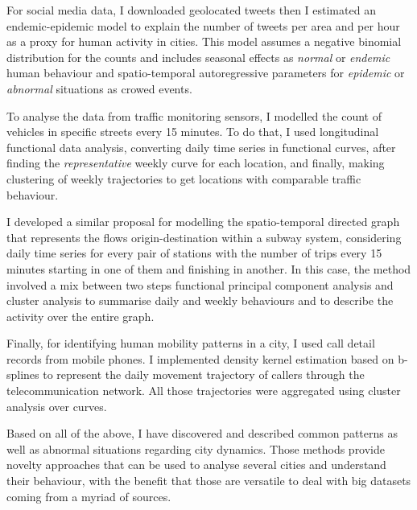 \documentclass[11pt, a4paper]{awesome-cv}
\begin{document}
\begin{cvletter}
For social media data, I downloaded geolocated tweets then I estimated an endemic-epidemic model to explain the number of tweets per area and per hour as a proxy for human activity in cities. This model assumes a negative binomial distribution for the counts and includes seasonal effects as \emph{normal} or \emph{endemic} human behaviour and spatio-temporal autoregressive parameters for \emph{epidemic} or \emph{abnormal} situations as crowed events.\par
To analyse the data from traffic monitoring sensors, I modelled the count of vehicles in specific streets every 15 minutes. To do that, I used longitudinal functional data analysis, converting daily time series in functional curves, after finding the \emph{representative} weekly curve for each location, and finally, making clustering of weekly trajectories to get locations with comparable traffic behaviour.\par 
I developed a similar proposal for modelling the spatio-temporal directed graph that represents the flows origin-destination within a subway system, considering daily time series for every pair of stations with the number of trips every 15 minutes starting in one of them and finishing in another. In this case, the method involved a mix between two steps functional principal component analysis and cluster analysis to summarise daily and weekly behaviours and to describe the activity over the entire graph.\par 
Finally, for identifying human mobility patterns in a city, I used call detail records from mobile phones.  I implemented density kernel estimation based on b-splines to represent the daily movement trajectory of callers through the telecommunication network. All those trajectories were aggregated using cluster analysis over curves.\par
Based on all of the above, I have discovered and described common patterns as well as abnormal situations regarding city dynamics. Those methods provide novelty approaches that can be used to analyse several cities and understand their behaviour, with the benefit that those are versatile to deal with big datasets coming from a myriad of sources.
\end{cvletter}


\end{document}
